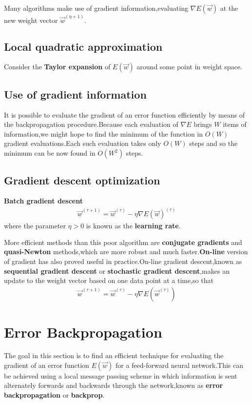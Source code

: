 Many algorithms make use of gradient information,evaluating $\nabla E(\vec{w})$  at the new weight vector $\vec{w}^{(\eta+1)}$.

\subsection{Local quadratic approximation}
Consider the \textbf{Taylor expansion} of $E(\vec{w})$ around some point in weight space.

\subsection{Use of gradient information}
It is possible to evaluate the gradient of an error function efficiently by means of the backpropagation procedure.Because each evaluation of $\nabla E$ brings $W$ items of information,we might hope to find the minimum of the function in $O(W)$ gradient evaluations.Each such evaluation takes only $O(W)$ steps and so the minimum can be now found in $O(W^2)$ steps.
\subsection{Gradient descent optimization}
\textbf{Batch gradient descent}
\begin{align}
\vec{w}^{(\tau+1)}=\vec{w}^{(\tau)}-\eta\nabla E(\vec{w})^{(\tau)}
\end{align}
where the parameter $\eta>0$ is known as the \textbf{learning rate}.

More efficient methods than this poor algorithm are \textbf{conjugate gradients} and \textbf{quasi-Newton} methods,which are more robust and much faster.\textbf{On-line} version of gradient has also proved useful in practice.On-line gradient descent,known as \textbf{sequential gradient descent } or \textbf{stochastic gradient descent},makes an update to the weight vector based on one data point at a time,so that
\begin{align}
\vec{w}^{(\tau+1)}=\vec{w}^{(\tau)}-\eta \nabla E(\vec{w}^{(\tau)})
\end{align}


\section{Error Backpropagation}
The goal in this section is to find an efficient technique for evaluating the gradient of an error function $E(\vec{w})$ for a feed-forward neural network.This can be achieved using a local message passing scheme in which information is sent alternately forwards and backwards through the network,known as \textbf{error backpropagation} or \textbf{backprop}.

